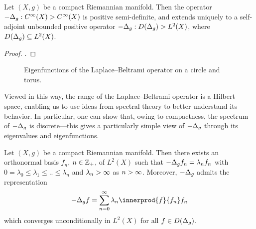 \documentclass[11pt]{book}
\begin{document}
\begin{result}
Let $(X,g)$ be a compact Riemannian manifold.
Then the operator $-\Delta_g : C^\infty(X) \-> C^\infty(X)$ is positive semi-definite, and extends uniquely to a self-adjoint unbounded positive operator $-\Delta_g: D(\Delta_g) \-> L^2(X)$, where $D(\Delta_g) \subseteq L^2(X)$.
\end{result}

\begin{proof}
\textcite[Theorem 2.4]{strichartz83}.
\end{proof}

\begin{figure}
\begin{subfigure}{0.19\textwidth}

\end{subfigure}
\begin{subfigure}{0.19\textwidth}

\end{subfigure}
\begin{subfigure}{0.59\textwidth}
\tikzset{external/export next=false}
\end{subfigure}
\caption[Laplace--Beltrami eigenfunctions: circle and torus]{Eigenfunctions of the Laplace--Beltrami operator on a circle and torus.}
\label{fig:eig-s1-t2}
\end{figure}

Viewed in this way, the range of the Laplace--Beltrami operator is a Hilbert space, enabling us to use ideas from spectral theory to better understand its behavior.
In particular, one can show that, owing to compactness, the spectrum of $-\Delta_g$ is discrete---this gives a particularly simple view of $-\Delta_g$ through its eigenvalues and eigenfunctions.

\label{ntn:laplace-beltrami-eigenpairs}
\begin{result}
Let $(X,g)$ be a compact Riemannian manifold.
Then there exists an orthonormal basis $f_n$, $n\in\mathbb{Z}_+$, of $L^2(X)$ such that $-\Delta_g f_n = \lambda_n f_n$ with $0 = \lambda_0 \leq \lambda_1 \leq .. \leq \lambda_n$ and $\lambda_n\-> \infty$ as $n\->\infty$.
Moreover, $-\Delta_g$ admits the representation
\[
-\lap_g f = \sum_{n=0}^\infty \lambda_n \innerprod{f}{f_n} f_n
\]
which converges unconditionally in $L^2(X)$ for all $f \in D(\Delta_g)$.
\end{result}
\end{document}
